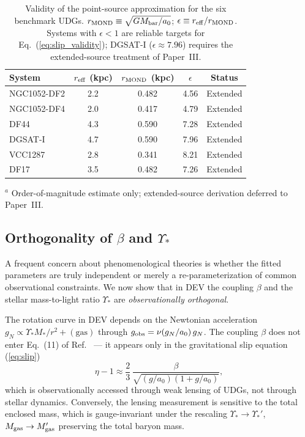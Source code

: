 \documentclass[aps,prd,reprint,floatfix,nofootinbib,superscriptaddress]{revtex4-2}
\newcommand{\aO}{a_0}
\begin{document}
\begin{table}[h]
\caption{Validity of the point-source approximation for the six
benchmark UDGs. $r_{\rm MOND} \equiv \sqrt{GM_{\rm bar}/\aO}$;
$\epsilon \equiv r_{\rm eff}/r_{\rm MOND}$. Systems with
$\epsilon < 1$ are reliable targets for Eq.~(\ref{eq:slip_validity});
DGSAT-I ($\epsilon \approx 7.96$) requires the extended-source
treatment of Paper~III.}
\label{tab:validity}
\begin{ruledtabular}
\begin{tabular}{lcccc}
System & $r_{\rm eff}$ (kpc) & $r_{\rm MOND}$ (kpc)
       & $\epsilon$ & Status \\
\hline
NGC1052-DF2 & 2.2 & 0.482 & 4.56 & Extended \\
NGC1052-DF4 & 2.0 & 0.417 & 4.79 & Extended \\
DF44        & 4.3 & 0.590 & 7.28 & Extended \\
DGSAT-I     & 4.7 & 0.590 & 7.96 & Extended \\
VCC1287     & 2.8 & 0.341 & 8.21 & Extended \\
DF17        & 3.5 & 0.482 & 7.26 & Extended \\
\end{tabular}
\end{ruledtabular}
{\small $^a$ Order-of-magnitude estimate only; extended-source
derivation deferred to Paper~III.}
\end{table}

\subsection{Orthogonality of \texorpdfstring{$\beta$ and $\Upsilon_*$}{beta and Upsilon}}

A frequent concern about phenomenological theories is whether the
fitted parameters are truly independent or merely a re-parameterization
of common observational constraints. We now show that in DEV the
coupling $\beta$ and the stellar mass-to-light ratio $\Upsilon_*$ are
\emph{observationally orthogonal}.

The rotation curve in DEV depends on the Newtonian acceleration
$g_N \propto \Upsilon_* M_*/r^2 + (\text{gas})$ through
$g_{\rm obs} = \nu(g_N/\aO)\,g_N$. The coupling $\beta$ does not
enter Eq.~(11) of Ref.~\cite{Mendes2026} — it appears only in the
gravitational slip equation (\ref{eq:slip})
\begin{equation}
  \eta - 1 \approx \frac{2}{3}\,\frac{\beta}{\sqrt{(g/\aO)(1+g/\aO)}},
  \label{eq:slip}
\end{equation}
which is observationally accessed through weak lensing of UDGs, not
through stellar dynamics. Conversely, the lensing measurement is
sensitive to the total enclosed mass, which is gauge-invariant under
the rescaling $\Upsilon_*\to\Upsilon_*'$, $M_{\rm gas}\to M_{\rm gas}'$
preserving the total baryon mass.
\end{document}

